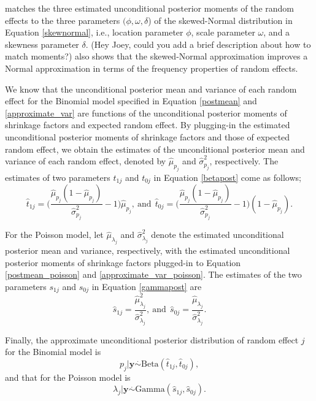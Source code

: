 \documentclass[article]{jss}
\begin{document}
\cite{kelly2014advances}  matches the  three estimated unconditional posterior  moments of the random effects to the three parameters $(\phi, \omega, \delta$) of the skewed-Normal distribution in Equation \ref{skewnormal}, i.e., location parameter $\phi$, scale parameter $\omega$, and a skewness parameter $\delta$. (Hey Joey, could you add a brief description about how to match moments?) \cite{kelly2014advances} also shows that the skewed-Normal approximation improves a Normal approximation \citep{tang2011, morris2012} in terms of the frequency properties   of random effects.

We know that the unconditional posterior mean and variance of each random effect for the Binomial model specified in Equation \ref{postmean} and \ref{approximate_var} are functions of the unconditional posterior moments of shrinkage factors and expected random effect.  By plugging-in the estimated unconditional posterior moments of shrinkage factors and those of expected random effect, we obtain the estimates of the unconditional posterior mean and variance of each random effect, denoted by $\hat{\mu}_{p_j}$ and $\hat{\sigma}^2_{p_j}$, respectively. The estimates of two parameters $t_{1j}$ and $t_{0j}$ in Equation \ref{betapost} come as follows;
\begin{equation}\label{posttrueprob}
\hat{t}_{1j}=\bigg(\frac{\hat{\mu}_{p_j}(1-\hat{\mu}_{p_j})}{\hat{\sigma}^2_{p_j}}-1\bigg)\hat{\mu}_{p_j},~\textrm{and}~~\hat{t}_{0j}=\bigg(\frac{\hat{\mu}_{p_j}(1-\hat{\mu}_{p_j})}{\hat{\sigma}^2_{p_j}}-1\bigg)(1-\hat{\mu}_{p_j}).
\end{equation}


 For the Poisson model, let  $\hat{\mu}_{\lambda_j}$ and $\hat{\sigma}^2_{\lambda_j}$ denote the estimated unconditional posterior mean and variance, respectively, with the estimated unconditional posterior moments of shrinkage factors plugged-in to Equation \ref{postmean_poisson} and \ref{approximate_var_poisson}. The estimates of the two parameters $s_{1j}$ and $s_{0j}$ in Equation \ref{gammapost} are
\begin{equation}\label{posttrueprob}
\hat{s}_{1j}=\frac{\hat{\mu}_{\lambda_j}^2}{\hat{\sigma}^2_{\lambda_j}},~\textrm{and}~~\hat{s}_{0j}=\frac{\hat{\mu}_{\lambda_j}}{\hat{\sigma}^2_{\lambda_j}}.
\end{equation}


Finally, the approximate unconditional posterior distribution of random effect $j$ for the Binomial model is
\begin{equation}\label{trueapprox}
p_j\vert \boldsymbol{y} \stackrel{.}{\sim} \textrm{Beta}(\hat{t}_{1j}, \hat{t}_{0j}),
\end{equation}
and that for the Poisson model is
\begin{equation}\label{trueapprox_poisson}
\lambda_j\vert \boldsymbol{y} \stackrel{.}{\sim} \textrm{Gamma}(\hat{s}_{1j}, \hat{s}_{0j}).
\end{equation}
\end{document}
